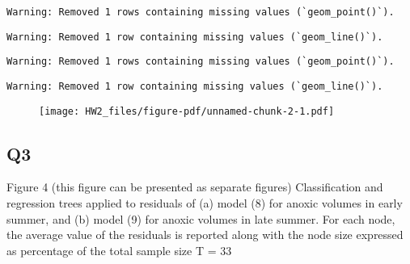 \documentclass[
  letterpaper,
  DIV=11,
  numbers=noendperiod]{scrartcl}
\newenvironment{Shaded}{\begin{snugshade}}{\end{snugshade}}
\newcommand{\AttributeTok}[1]{\textcolor[rgb]{0.40,0.45,0.13}{#1}}
\newcommand{\DecValTok}[1]{\textcolor[rgb]{0.68,0.00,0.00}{#1}}
\newcommand{\FloatTok}[1]{\textcolor[rgb]{0.68,0.00,0.00}{#1}}
\newcommand{\FunctionTok}[1]{\textcolor[rgb]{0.28,0.35,0.67}{#1}}
\newcommand{\NormalTok}[1]{\textcolor[rgb]{0.00,0.23,0.31}{#1}}
\newcommand{\OtherTok}[1]{\textcolor[rgb]{0.00,0.23,0.31}{#1}}
\newcommand{\SpecialCharTok}[1]{\textcolor[rgb]{0.37,0.37,0.37}{#1}}
\newcommand{\StringTok}[1]{\textcolor[rgb]{0.13,0.47,0.30}{#1}}
\begin{document}
\begin{Shaded}
\end{Shaded}

\begin{verbatim}
Warning: Removed 1 rows containing missing values (`geom_point()`).
\end{verbatim}

\begin{verbatim}
Warning: Removed 1 row containing missing values (`geom_line()`).
\end{verbatim}

\begin{verbatim}
Warning: Removed 1 rows containing missing values (`geom_point()`).
\end{verbatim}

\begin{verbatim}
Warning: Removed 1 row containing missing values (`geom_line()`).
\end{verbatim}

\begin{figure}[H]

{\centering \texttt{[image: HW2\_files/figure-pdf/unnamed-chunk-2-1.pdf]}

}

\end{figure}

\hypertarget{q3}{%
\subsection{Q3}\label{q3}}

Figure 4 (this figure can be presented as separate figures)
Classification and regression trees applied to residuals of (a) model
(8) for anoxic volumes in early summer, and (b) model (9) for anoxic
volumes in late summer. For each node, the average value of the
residuals is reported along with the node size expressed as percentage
of the total sample size T = 33
\end{document}
